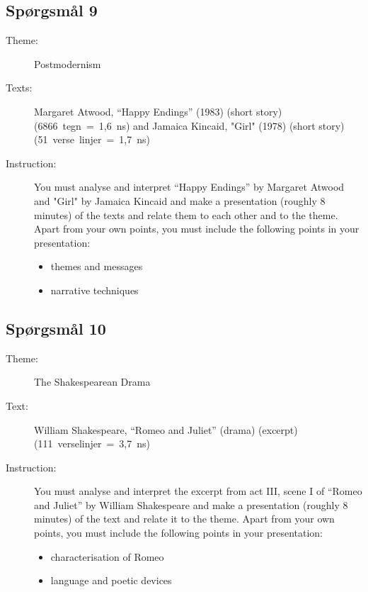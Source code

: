 \documentclass[10pt,a4paper]{article}
\begin{document}
\subsection{Spørgsmål 9}
\begin{description}
\item[Theme:] Postmodernism
\item[Texts:] Margaret Atwood, “Happy Endings” (1983) (short story) (6866~tegn~=~1,6~ns) and Jamaica Kincaid, "Girl" (1978) (short story) (51~verse~linjer~=~1,7~ns)
\item[Instruction:] You must analyse and interpret “Happy Endings” by Margaret Atwood and "Girl" by Jamaica Kincaid and make a presentation (roughly 8 minutes) of the texts and relate them to each other and to the theme. Apart from your own points, you must include the following points in your presentation:
\begin{itemize}
\item themes and messages
\item narrative techniques
\end{itemize}
\end{description}

\subsection{Spørgsmål 10}
\begin{description}
\item[Theme:] The Shakespearean Drama
\item[Text:] William Shakespeare, “Romeo and Juliet” (drama) (excerpt) (111~verselinjer~=~3,7~ns)
\item[Instruction:] You must analyse and interpret the excerpt from act III, scene I of “Romeo and Juliet” by William Shakespeare and make a presentation (roughly 8 minutes) of the text and relate it to the theme. Apart from your own points, you must include the following points in your presentation:
\begin{itemize}
\item characterisation of Romeo 
\item language and poetic devices
\end{itemize}
\end{description}
\end{document}
